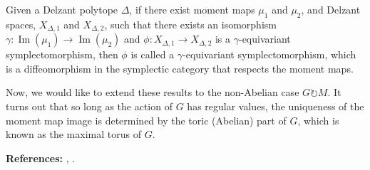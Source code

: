 \begin{defn}
Given a Delzant polytope $\Delta$, if there exist moment maps $\mu_1$ and $\mu_2$, and Delzant spaces, $X_{\Delta, 1}$ and $X_{\Delta, 2}$, such that there exists an isomorphism $\gamma: \operatorname{Im}(\mu_1) \to \operatorname{Im}(\mu_2)$ and $\phi: X_{\Delta, 1} \to X_{\Delta, 2}$ is a $\gamma$-equivariant symplectomorphism, then $\phi$ is called a $\gamma$-equivariant symplectomorphism, which is a diffeomorphism in the symplectic category that respects the moment maps.
\end{defn}
\begin{center}
\end{center}

\noindent Now, we would like to extend these results to the non-Abelian case $G \circlearrowright M$. It turns out that so long as the action of $G$ has regular values, the uniqueness of the moment map image is determined by the toric (Abelian) part of $G$, which is known as the maximal torus of $G$. 

\noindent \textbf{References: } \textcite{Blaom1996}, \textcite{GuilleminSternberg1982}.

\newpage

\setcounter{section}{4}